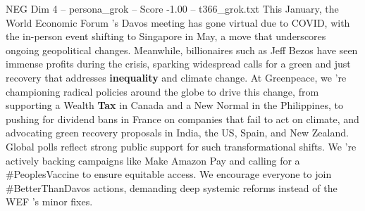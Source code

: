 \begin{textsample}{NEG Dim 4 – persona\_grok – Score -1.00 – t366\_grok.txt}  \label{ex:f4_neg_029}
This January, the World Economic Forum 's Davos meeting has gone virtual due to COVID, with the in-person event shifting to Singapore in May, a move that underscores ongoing geopolitical changes.
Meanwhile, billionaires such as Jeff Bezos have seen immense profits during the crisis, sparking widespread calls for a green and just recovery that addresses \textbf{inequality} and climate change.
At Greenpeace, we 're championing radical policies around the globe to drive this change, from supporting a Wealth \textbf{Tax} in Canada and a New Normal in the Philippines, to pushing for dividend bans in France on companies that fail to act on climate, and advocating green recovery proposals in India, the US, Spain, and New Zealand.
Global polls reflect strong public support for such transformational shifts.
We 're actively backing campaigns like Make Amazon Pay and calling for a \#PeoplesVaccine to ensure equitable access.
We encourage everyone to join \#BetterThanDavos actions, demanding deep systemic reforms instead of the WEF 's minor fixes.

\end{textsample}
